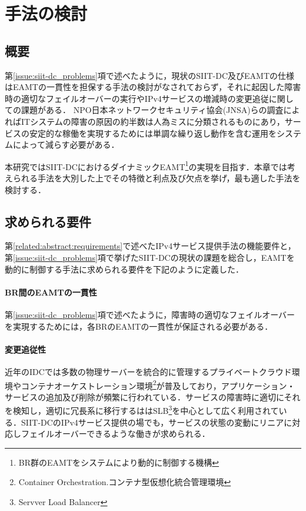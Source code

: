 \chapter{手法の検討}
\label{consideration}

\section{概要}
第\ref{issue:siit-dc_problems}項で述べたように，現状のSIIT-DC及びEAMTの仕様はEAMTの一貫性を担保する手法の検討がなされておらず，それに起因した障害時の適切なフェイルオーバーの実行やIPv4サービスの増減時の変更追従に関しての課題がある．
NPO日本ネットワークセキュリティ協会(JNSA)らの調査によればITシステムの障害の原因の約半数は人為ミスに分類されるものにあり\cite{human_error}，サービスの安定的な稼働を実現するためには単調な繰り返し動作を含む運用をシステムによって減らす必要がある．

本研究ではSIIT-DCにおけるダイナミックEAMT\footnote{BR群のEAMTをシステムにより動的に制御する機構}の実現を目指す．本章では考えられる手法を大別した上でその特徴と利点及び欠点を挙げ，最も適した手法を検討する．


\section{求められる要件}
\label{consideration:points}

第\ref{related:abstract:requirements}で述べたIPv4サービス提供手法の機能要件と，第\ref{issue:siit-dc_problems}項で挙げたSIIT-DCの現状の課題を総合し，EAMTを動的に制御する手法に求められる要件を下記のように定義した．

\subsubsection{BR間のEAMTの一貫性}
第\ref{issue:siit-dc_problems}項で述べたように，障害時の適切なフェイルオーバーを実現するためには，各BRのEAMTの一貫性が保証される必要がある．

\subsubsection{変更追従性}
近年のIDCでは多数の物理サーバーを統合的に管理するプライベートクラウド環境やコンテナオーケストレーション環境\footnote{Container Orchestration.コンテナ型仮想化統合管理環境}が普及しており，アプリケーション・サービスの追加及び削除が頻繁に行われている．サービスの障害時に適切にそれを検知し，適切に冗長系に移行するははSLB\footnote{Servver Load Balancer}を中心として広く利用されている．SIIT-DCのIPv4サービス提供の場でも，サービスの状態の変動にリニアに対応しフェイルオーバーできるような働きが求められる．

